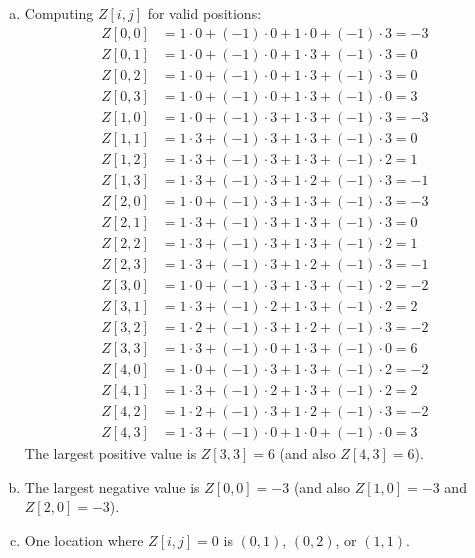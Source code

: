 \documentclass[11pt]{article}
\begin{document}
\begin{enumerate}
\begin{solution}
\begin{enumerate}[(a)]
\item Computing $Z[i,j]$ for valid positions:
\begin{align*}
Z[0,0] &= 1\cdot 0 + (-1)\cdot 0 + 1\cdot 0 + (-1)\cdot 3 = -3 \\
Z[0,1] &= 1\cdot 0 + (-1)\cdot 0 + 1\cdot 3 + (-1)\cdot 3 = 0 \\
Z[0,2] &= 1\cdot 0 + (-1)\cdot 0 + 1\cdot 3 + (-1)\cdot 3 = 0 \\
Z[0,3] &= 1\cdot 0 + (-1)\cdot 0 + 1\cdot 3 + (-1)\cdot 0 = 3 \\
Z[1,0] &= 1\cdot 0 + (-1)\cdot 3 + 1\cdot 3 + (-1)\cdot 3 = -3 \\
Z[1,1] &= 1\cdot 3 + (-1)\cdot 3 + 1\cdot 3 + (-1)\cdot 3 = 0 \\
Z[1,2] &= 1\cdot 3 + (-1)\cdot 3 + 1\cdot 3 + (-1)\cdot 2 = 1 \\
Z[1,3] &= 1\cdot 3 + (-1)\cdot 3 + 1\cdot 2 + (-1)\cdot 3 = -1 \\
Z[2,0] &= 1\cdot 0 + (-1)\cdot 3 + 1\cdot 3 + (-1)\cdot 3 = -3 \\
Z[2,1] &= 1\cdot 3 + (-1)\cdot 3 + 1\cdot 3 + (-1)\cdot 3 = 0 \\
Z[2,2] &= 1\cdot 3 + (-1)\cdot 3 + 1\cdot 3 + (-1)\cdot 2 = 1 \\
Z[2,3] &= 1\cdot 3 + (-1)\cdot 3 + 1\cdot 2 + (-1)\cdot 3 = -1 \\
Z[3,0] &= 1\cdot 0 + (-1)\cdot 3 + 1\cdot 3 + (-1)\cdot 2 = -2 \\
Z[3,1] &= 1\cdot 3 + (-1)\cdot 2 + 1\cdot 3 + (-1)\cdot 2 = 2 \\
Z[3,2] &= 1\cdot 2 + (-1)\cdot 3 + 1\cdot 2 + (-1)\cdot 3 = -2 \\
Z[3,3] &= 1\cdot 3 + (-1)\cdot 0 + 1\cdot 3 + (-1)\cdot 0 = 6 \\
Z[4,0] &= 1\cdot 0 + (-1)\cdot 3 + 1\cdot 3 + (-1)\cdot 2 = -2 \\
Z[4,1] &= 1\cdot 3 + (-1)\cdot 2 + 1\cdot 3 + (-1)\cdot 2 = 2 \\
Z[4,2] &= 1\cdot 2 + (-1)\cdot 3 + 1\cdot 2 + (-1)\cdot 3 = -2 \\
Z[4,3] &= 1\cdot 3 + (-1)\cdot 0 + 1\cdot 0 + (-1)\cdot 0 = 3
\end{align*}
The largest positive value is $Z[3,3] = 6$ (and also $Z[4,3] = 6$).

\item The largest negative value is $Z[0,0] = -3$ (and also $Z[1,0] = -3$ and $Z[2,0] = -3$).

\item One location where $Z[i,j] = 0$ is $(0,1)$, $(0,2)$, or $(1,1)$.
\end{enumerate}
\end{solution}


\end{enumerate}
\end{document}
